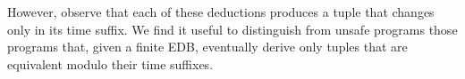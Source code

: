 However, observe that each of these deductions produces a tuple that changes
only in its time suffix.  We find it useful to distinguish from unsafe
programs those programs that, given a finite EDB, eventually derive only tuples
that are equivalent modulo their time suffixes. 







%

